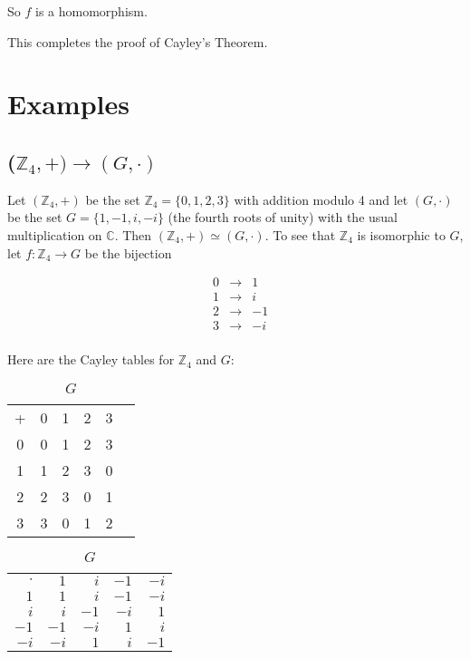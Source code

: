 \documentclass[11pt, oneside]{article}   	%
\theoremstyle{definition}
\begin{document}
\bigskip
\noindent
So  $f$ is a homomorphism. 

\bigskip
\noindent
This completes the proof of  Cayley's Theorem.


\section{Examples}


\subsection{($\mathbb{Z}_4,+) \rightarrow (G,\cdot)$}
Let $(\mathbb{Z}_4,+)$ be the set $\mathbb{Z}_4 = \{0,1,2,3\}$ with addition modulo 4 and let $(G,\cdot)$ be the set $G = \{1,-1,i,-i\}$ (the fourth roots of unity) 
with the usual multiplication on $\mathbb{C}$. Then $(\mathbb{Z}_4,+) \simeq (G,\cdot)$. To see that $\mathbb{Z}_4$ is isomorphic to $G$, let 
$f: \mathbb{Z}_4 \rightarrow G$ be the bijection

\begin{equation*}
\begin{array}{lccr}
& 0 &\longrightarrow&  1 \\
& 1 &\longrightarrow&  i \\
& 2 &\longrightarrow&  -1 \\
& 3 &\longrightarrow&  -i \\
\end{array}
\end{equation*}

\bigskip
\noindent
Here are the Cayley tables for $\mathbb{Z}_4$ and $G$:

\bigskip
\begin{table}[ht]
\begin{minipage}{0.5\linewidth} 
\centering
\begin{tabular}{c | c c c c c} 
+ & 0 & 1  & 2 & 3 \\
\cline{1-5}
0 & 0 & 1 & 2 & 3 \\
1 & 1 & 2 & 3 & 0 \\
2 & 2 & 3 & 0 & 1 \\
3 & 3 & 0 & 1 & 2
\end{tabular}
\caption{$\mathbb{Z}_4$} 
\label{tab:z4}
\end{minipage}
%
 \begin{minipage}{0.5\linewidth} 
\centering
\begin{tabular}{r | r r r r} 
$\cdot$ & $1$ & $i$  & $-1$ & $-i$ \\
\cline{1-5}
$1$   & $1$   & $i$     & $-1$   & $-i$  \\
$i$    & $i$    & $-1$   & $-i$    & $1$  \\
$-1$  & $-1$  & $-i$    & $1$    & $i$    \\
$-i$   &  $-i$  & $1$     & $i$     & $-1$
\end{tabular}
\caption{$G$} 
\label{tab:G}
\end{minipage}
\end{table}
\end{document}

